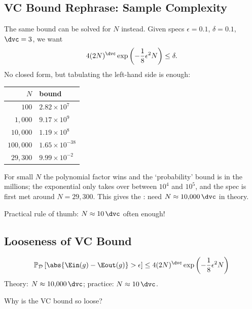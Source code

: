\subsection{VC Bound Rephrase: Sample Complexity}

The same bound can be solved for \(N\) instead. Given specs \(\epsilon = 0.1\),
\(\delta = 0.1\), \(\dvc = 3\), we want
\[
    4 (2N)^{\dvc} \exp \left( -\frac{1}{8} \epsilon^2 N \right) \le \delta .
\]
No closed form, but tabulating the left-hand side is enough:

\begin{center}
    \solidrules
    \begin{tabular}{@{}r|l@{}}
        \toprule
        \(N\) & bound\\
        \midrule
        \(100\) & \(2.82 \times 10^{7}\)\\
        \(1{,}000\) & \(9.17 \times 10^{9}\)\\
        \(10{,}000\) & \(1.19 \times 10^{8}\)\\
        \(100{,}000\) & \textcolor{orange!85!black}{\(1.65 \times 10^{-38}\)}\\
        \(29{,}300\) & \textcolor{orange!85!black}{\(9.99 \times 10^{-2}\)}\\
        \bottomrule
    \end{tabular}
\end{center}

For small \(N\) the polynomial factor wins and the `probability' bound is in
the millions; the exponential only takes over between \(10^4\) and \(10^5\),
and the spec is first met around \(N = 29{,}300\). This gives the
: need \(N \approx 10{,}000\, \dvc\) in theory.

\begin{moral}
    Practical rule of thumb: \(N \approx 10\, \dvc\) often enough!
\end{moral}

\subsection{Looseness of VC Bound}

\[
    \mathbb{P}_{\mathcal{D}}\left[ \abs{\Ein(g) - \Eout(g)} > \epsilon \right]
    \le 4 (2N)^{\dvc} \exp \left( -\frac{1}{8} \epsilon^2 N \right)
\]
Theory: \(N \approx 10{,}000\, \dvc\); practice: \(N \approx 10\, \dvc\).

\begin{question}
    Why is the VC bound so loose?
\end{question}

